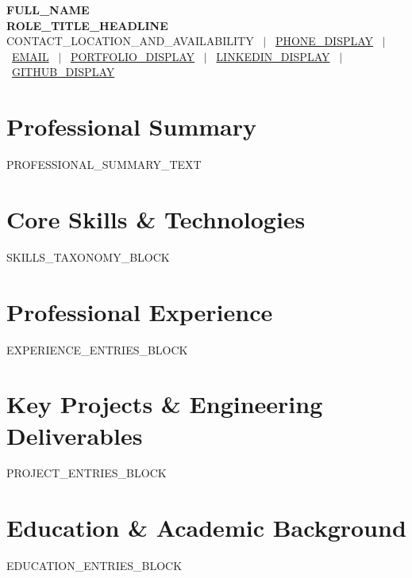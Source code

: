 \documentclass[letterpaper,10pt]{article}
\newcommand{\resumeSubHeadingListStart}{\begin{itemList}[leftmargin=0.1in, label={}]}
\newcommand{\resumeSubHeadingListEnd}{\end{itemList}}
\newenvironment{itemList}[1][]
  {\begin{itemize}[#1]}
  {\end{itemize}}
\begin{document}
\begin{center}
    {\LARGE \textbf{\scshape {{FULL_NAME}}}} \\ \vspace{2pt}
    {\small \textbf{\color{NavyBlue} {{ROLE_TITLE_HEADLINE}}}} \\ \vspace{2pt}
    \footnotesize 
    {{CONTACT_LOCATION_AND_AVAILABILITY}} \ $|$ \ 
    \href{tel:{{PHONE_RAW}}}{{{PHONE_DISPLAY}}} \ $|$ \ 
    \href{mailto:{{EMAIL}}}{{{EMAIL}}} \ $|$ \ 
    \href{{{PORTFOLIO_URL}}}{{{PORTFOLIO_DISPLAY}}} \ $|$ \ 
    \href{{{LINKEDIN_URL}}}{{{LINKEDIN_DISPLAY}}} \ $|$ \ 
    \href{{{GITHUB_URL}}}{{{GITHUB_DISPLAY}}}
\end{center}

\vspace{-6pt}

\section{Professional Summary}
\small{
{{PROFESSIONAL_SUMMARY_TEXT}}
}

\vspace{0pt}

\section{Core Skills \& Technologies}
 \begin{itemList}[leftmargin=0.1in, label={}]
    \small{\item{
      {{SKILLS_TAXONOMY_BLOCK}}
    }}
 \end{itemList}

\vspace{-4pt}

\section{Professional Experience}
  \resumeSubHeadingListStart

{{EXPERIENCE_ENTRIES_BLOCK}}

  \resumeSubHeadingListEnd

\vspace{-4pt}

\section{Key Projects \& Engineering Deliverables}
  \resumeSubHeadingListStart

{{PROJECT_ENTRIES_BLOCK}}

  \resumeSubHeadingListEnd

\vspace{-4pt}

\section{Education \& Academic Background}
  \resumeSubHeadingListStart

{{EDUCATION_ENTRIES_BLOCK}}

  \resumeSubHeadingListEnd
\end{document}

